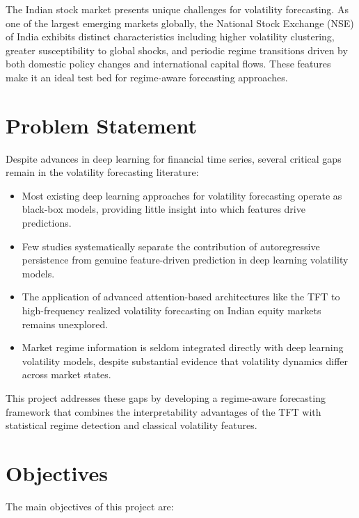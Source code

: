The Indian stock market presents unique challenges for volatility forecasting. As one of the largest emerging markets globally, the National Stock Exchange (NSE) of India exhibits distinct characteristics including higher volatility clustering, greater susceptibility to global shocks, and periodic regime transitions driven by both domestic policy changes and international capital flows. These features make it an ideal test bed for regime-aware forecasting approaches.

\section{Problem Statement}

Despite advances in deep learning for financial time series, several critical gaps remain in the volatility forecasting literature:

\begin{itemize}
    \item Most existing deep learning approaches for volatility forecasting operate as black-box models, providing little insight into which features drive predictions.
    \item Few studies systematically separate the contribution of autoregressive persistence from genuine feature-driven prediction in deep learning volatility models.
    \item The application of advanced attention-based architectures like the TFT to high-frequency realized volatility forecasting on Indian equity markets remains unexplored.
    \item Market regime information is seldom integrated directly with deep learning volatility models, despite substantial evidence that volatility dynamics differ across market states.
\end{itemize}

This project addresses these gaps by developing a regime-aware forecasting framework that combines the interpretability advantages of the TFT with statistical regime detection and classical volatility features.

\section{Objectives}

The main objectives of this project are:

